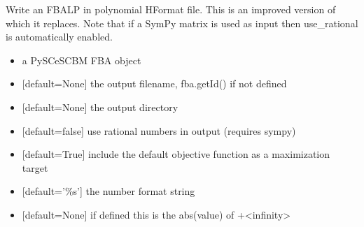 \documentclass[letterpaper,10pt,english]{sphinxmanual}
\begin{document}

\begin{fulllineitems}
\label{\detokenize{modules_doc:cbmpy.CBWrite.writeModelHFormatFBA2}}
\pysigstartsignatures
{}
\pysigstopsignatures
\sphinxAtStartPar
Write an FBA\sphinxhyphen{}LP in polynomial H\sphinxhyphen{}Format file. This is an improved version of 
which it replaces. Note that if a SymPy matrix is used as input then use\_rational is automatically enabled.
\begin{itemize}
\item {} 
\sphinxAtStartPar
{} a PySCeS\sphinxhyphen{}CBM FBA object

\item {} 
\sphinxAtStartPar
{} {[}default=None{]} the output filename, fba.getId() if not defined

\item {} 
\sphinxAtStartPar
{} {[}default=None{]} the output directory

\item {} 
\sphinxAtStartPar
{} {[}default=false{]} use rational numbers in output (requires sympy)

\item {} 
\sphinxAtStartPar
{} {[}default=True{]} include the default objective function as a maximization target

\item {} 
\sphinxAtStartPar
{} {[}default=’\%s’{]} the number format string

\item {} 
\sphinxAtStartPar
{} {[}default=None{]} if defined this is the abs(value) of +\sphinxhyphen{}\textless{}infinity\textgreater{}

\end{itemize}

\end{fulllineitems}
\end{document}
